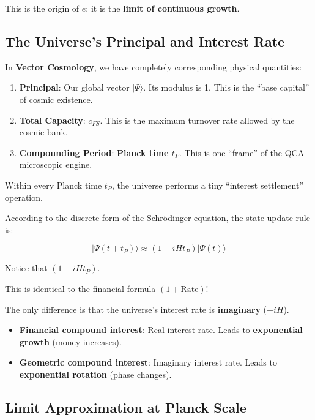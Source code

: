 This is the origin of \textbf{$e$}: it is the \textbf{limit of continuous growth}.

\subsection{The Universe's Principal and Interest Rate}

In \textbf{Vector Cosmology}, we have completely corresponding physical quantities:

\begin{enumerate}
\item \textbf{Principal}: Our global vector $|\Psi\rangle$. Its modulus is 1. This is the ``base capital'' of cosmic existence.

\item \textbf{Total Capacity}: $c_{FS}$. This is the maximum turnover rate allowed by the cosmic bank.

\item \textbf{Compounding Period}: \textbf{Planck time $t_P$}. This is one ``frame'' of the QCA microscopic engine.
\end{enumerate}

Within every Planck time $t_P$, the universe performs a tiny ``interest settlement'' operation.

According to the discrete form of the Schrödinger equation, the state update rule is:

$$|\Psi(t + t_P)\rangle \approx (1 - i H t_P) |\Psi(t)\rangle$$

Notice that $(1 - i H t_P)$.

This is identical to the financial formula $(1 + \text{Rate})$!

The only difference is that the universe's interest rate is \textbf{imaginary} ($-iH$).

\begin{itemize}
\item \textbf{Financial compound interest}: Real interest rate. Leads to \textbf{exponential growth} (money increases).

\item \textbf{Geometric compound interest}: Imaginary interest rate. Leads to \textbf{exponential rotation} (phase changes).
\end{itemize}

\subsection{Limit Approximation at Planck Scale}

